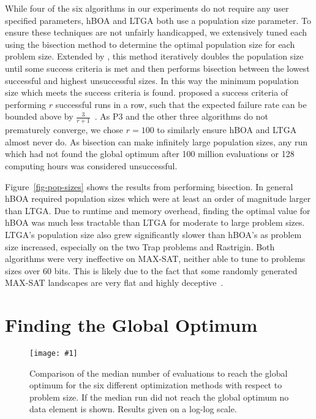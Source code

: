 \documentclass[twoside]{article}
\newcommand{\includegraphicsfit}[1]
{\texttt{[image: \#1]}}
\begin{document}
While four of the six algorithms in our experiments do not require any user specified parameters,
hBOA and LTGA both use a population size parameter. To ensure these techniques are not unfairly
handicapped, we extensively tuned each using the bisection method \citep{sastry:2001:bisection}
to determine the optimal population size for each problem size.
Extended by \cite{goldman:2012:ltga}, this method iteratively
doubles the population size until some success criteria is met and then performs bisection
between the lowest successful and highest unsuccessful sizes. In this way the minimum population size
which meets the success criteria is found. \cite{goldman:2014:p3} proposed a success criteria
of performing $r$ successful runs in a row, such that the expected failure rate can be bounded
above by $\frac{3}{r+1}$~\citep{jovanovic:1997:ruleofthree}. As P3 and the other three algorithms
do not prematurely converge, we chose $r=100$ to similarly ensure hBOA and LTGA almost never do.
As bisection can make infinitely large population sizes, any run which had not found the global
optimum after 100 million evaluations or 128 computing hours was considered unsuccessful.

Figure~\ref{fig-pop-sizes} shows the results from performing bisection. In general hBOA
required population sizes which were at least an order of magnitude larger than LTGA. Due to
runtime and memory overhead, finding the optimal value for hBOA was much less tractable than LTGA
for moderate to large problem sizes. LTGA's population size also grew significantly slower
than hBOA's as problem size increased, especially on the two Trap problems and Rastrigin.
Both algorithms were very ineffective on MAX-SAT, neither able to tune to problems sizes over 60 bits.
This is likely due to the fact that some randomly generated MAX-SAT landscapes are very flat
and highly deceptive~\cite{rana:1998:gamaxsat}.
\section{Finding the Global Optimum}
\label{sec-optimum}

\begin{figure}
  \begin{center}
  \includegraphicsfit{evals-to-success}
  \end{center}
  \caption{Comparison of the median number of evaluations to reach the global optimum for
           the six different optimization methods with respect
           to problem size.  If the median run did not reach the global optimum no data element
           is shown.  Results given on a log-log scale.}
  \label{fig-evals-to-success}
\end{figure}
\end{document}
